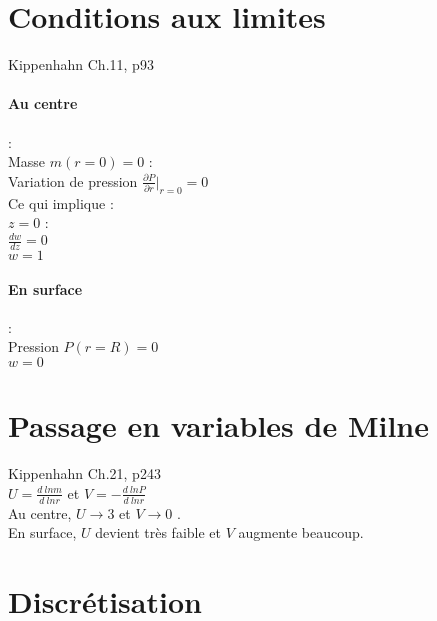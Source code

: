 \documentclass[a4paper,10pt]{article}
\begin{document}
\section{Conditions aux limites}
Kippenhahn Ch.11, p93
\paragraph{Au centre}: \\
Masse $m(r=0)=0$ : \\
Variation de pression $\frac{\partial P}{\partial r}\vert_{r=0} = 0$\\
Ce qui implique :\\
$z=0$ :\\
$\frac{dw}{dz}=0$\\
$w=1$

\paragraph{En surface}: \\
Pression $P(r=R)=0$\\

$w=0$

\section{Passage en variables de Milne}
Kippenhahn Ch.21, p243\\
$U=\frac{d~ln m}{d~ln r} $ et $V=-\frac{d~ln P}{d~lnr}$\\
Au centre, $U \rightarrow 3$ et $V \rightarrow 0$ .\\
En surface, $U$ devient très faible et $V$ augmente beaucoup.

\section{Discrétisation}
%
%
\end{document}
